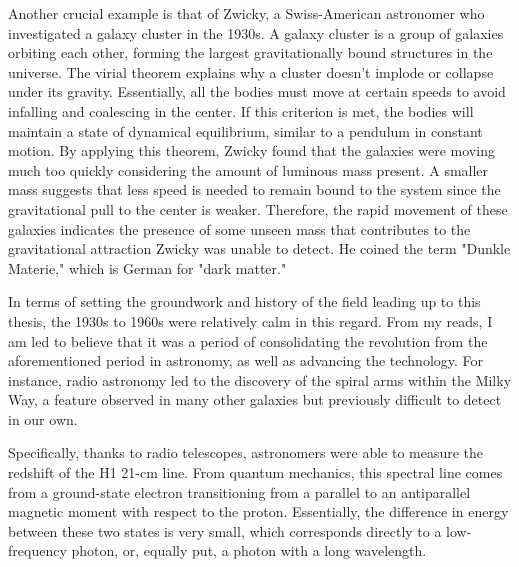 Another crucial example is that of Zwicky, a Swiss-American astronomer who investigated a galaxy cluster in the 1930s. A galaxy cluster is a group of galaxies orbiting each other, forming the largest gravitationally bound structures in the universe. The virial theorem explains why a cluster doesn't implode or collapse under its gravity. Essentially, all the bodies must move at certain speeds to avoid infalling and coalescing in the center. If this criterion is met, the bodies will maintain a state of dynamical equilibrium, similar to a pendulum in constant motion. By applying this theorem, Zwicky found that the galaxies were moving much too quickly considering the amount of luminous mass present. A smaller mass suggests that less speed is needed to remain bound to the system since the gravitational pull to the center is weaker. Therefore, the rapid movement of these galaxies indicates the presence of some unseen mass that contributes to the gravitational attraction Zwicky was unable to detect. He coined the term "Dunkle Materie," which is German for "dark matter." 


In terms of setting the groundwork and history of the field leading up to this thesis, the 1930s to 1960s were relatively calm in this regard. From my reads, I am led to believe that it was a period of consolidating the revolution from the aforementioned period in astronomy, as well as advancing the technology. For instance, radio astronomy led to the discovery of the spiral arms within the Milky Way, a feature observed in many other galaxies but previously difficult to detect in our own. 

Specifically, thanks to radio telescopes, astronomers were able to measure the redshift of the H1 21-cm line. From quantum mechanics, this spectral line comes from a ground-state electron transitioning from a parallel to an antiparallel magnetic moment with respect to the proton. Essentially, the difference in energy between these two states is very small, which corresponds directly to a low-frequency photon, or, equally put, a photon with a long wavelength. 

